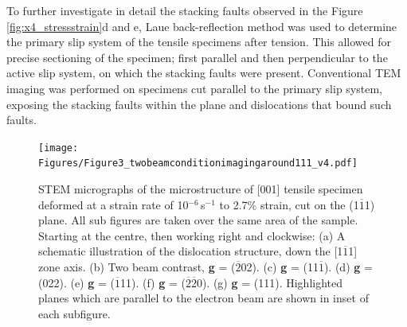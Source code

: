\documentclass[a4paper,12pt,times,numbered,print,index]{Classes/PhDThesisPSnPDF}
\begin{document}
To further investigate in detail the stacking faults observed in the Figure \ref{fig:x4_stressstrain}d and e, Laue back-reflection method was used to determine the primary slip system of the tensile specimens after tension. This allowed for precise sectioning of the specimen; first parallel and then perpendicular to the active slip system, on which the stacking faults were present. Conventional TEM imaging was performed on specimens cut parallel to the primary slip system, exposing the stacking faults within the plane and dislocations that bound such faults.\\
\begin{figure}
\centering
\texttt{[image: Figures/Figure3\_twobeamconditionimagingaround111\_v4.pdf]}
\caption{STEM micrographs of the microstructure of [001] tensile specimen deformed at a strain rate of 10$^{-6}$\,s$^{-1}$ to 2.7\% strain, cut on the (1$\overline{1}$1) plane. All sub figures are taken over the same area of the sample. Starting at the centre, then working right and clockwise: (a) A schematic illustration of the dislocation structure, down the [1$\overline{1}$1] zone axis. (b) Two beam contrast, \textbf{g} = ($\overline{2}$02). (c) \textbf{g} = (11$\overline{1}$). (d) \textbf{g} = (022). (e) \textbf{g} = ($\overline{1}$11). (f) \textbf{g} = ($\overline{2}\overline{2}$0). (g) \textbf{g} = (111). Highlighted planes which are parallel to the electron beam are shown in inset of each subfigure.}
\label{fig:SF}
\end{figure}
\end{document}
